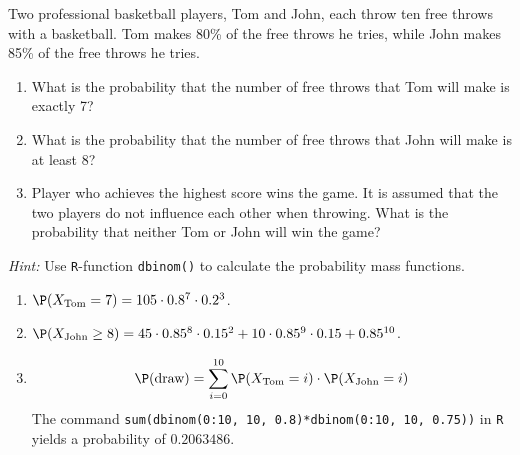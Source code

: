
\begin{exercise}

Two professional basketball players, Tom and John, each throw ten free throws with
a basketball. Tom makes 80\% of the free throws he tries, while John makes 85\%
of the free throws he tries.

\begin{enumerate}[label = (\alph*)]
  \item What is the probability that the number of free throws that Tom will make
  is exactly 7?
  \item What is the probability that the number of free throws that John will make
  is at least 8?
  \item Player who achieves the highest score wins the game. It is assumed that
  the two players do not influence each other when throwing. What is the probability
  that neither Tom or John will win the game?
\end{enumerate}
\textit{Hint:} Use \texttt{R}-function \texttt{dbinom()} to calculate the probability
mass functions.

\end{exercise}


\begin{solution}

\phantom{}

\begin{enumerate}[label = (\alph*)]
  \item $\P(X_{\text{Tom}} = 7) = 105 \cdot 0.8^{7}\cdot0.2^{3}$.
  \item $\P(X_{\text{John}} \geq 8) =
  45\cdot0.85^{8}\cdot0.15^{2} + 10\cdot 0.85^{9}\cdot 0.15 + 0.85^{10}$.
  \item
  \begin{align*}
    \P(\text{draw}) = \sum_{i=0}^{10} \P(X_{\text{Tom}} = i) \cdot \P(X_{\text{John}} = i)
  \end{align*}
  The command \texttt{sum(dbinom(0:10, 10, 0.8)*dbinom(0:10, 10, 0.75))} in \texttt{R}
  yields a probability of $0.2063486$.
\end{enumerate}

\end{solution}

